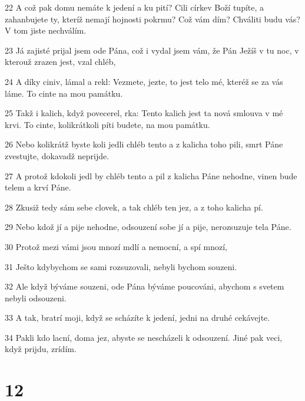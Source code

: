 \par 22 A což pak domu nemáte k jedení a ku pití? Cili církev Boží tupíte, a zahanbujete ty, kteríž nemají hojnosti pokrmu? Což vám dím? Chváliti budu vás? V tom jiste nechválím.
\par 23 Já zajisté prijal jsem ode Pána, což i vydal jsem vám, že Pán Ježíš v tu noc, v kterouž zrazen jest, vzal chléb,
\par 24 A díky ciniv, lámal a rekl: Vezmete, jezte, to jest telo mé, kteréž se za vás láme. To cinte na mou památku.
\par 25 Takž i kalich, když povecerel, rka: Tento kalich jest ta nová smlouva v mé krvi. To cinte, kolikrátkoli píti budete, na mou památku.
\par 26 Nebo kolikrátž byste koli jedli chléb tento a z kalicha toho pili, smrt Páne zvestujte, dokavadž neprijde.
\par 27 A protož kdokoli jedl by chléb tento a pil z kalicha Páne nehodne, vinen bude telem a krví Páne.
\par 28 Zkusiž tedy sám sebe clovek, a tak chléb ten jez, a z toho kalicha pí.
\par 29 Nebo kdož jí a pije nehodne, odsouzení sobe jí a pije, nerozsuzuje tela Páne.
\par 30 Protož mezi vámi jsou mnozí mdlí a nemocní, a spí mnozí,
\par 31 Ješto kdybychom se sami rozsuzovali, nebyli bychom souzeni.
\par 32 Ale když býváme souzeni, ode Pána býváme poucováni, abychom s svetem nebyli odsouzeni.
\par 33 A tak, bratrí moji, když se scházíte k jedení, jedni na druhé cekávejte.
\par 34 Pakli kdo lacní, doma jez, abyste se nescházeli k odsouzení. Jiné pak veci, když prijdu, zrídím.

\chapter{12}

